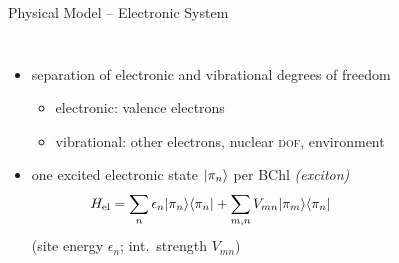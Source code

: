 \documentclass{beamer}
\begin{document}
\begin{frame}[label=ElHamiltonian]{Physical Model -- Electronic System}
  \begin{columns}
    \begin{itemize}
      \item separation of electronic and vibrational degrees of freedom
        \begin{itemize}
          \item electronic: valence electrons
          \item vibrational: other electrons, nuclear \textsc{dof}, environment
        \end{itemize}
      \item one excited electronic state $| \pi_n \rangle$ per BChl \emph{(exciton)}
        \[ H_\mathrm{el} = \sum_n \epsilon_n | \pi_n \rangle\langle \pi_n | + \sum_{m,n} V_{mn} | \pi_m \rangle\langle \pi_n | \]
      (site energy $\epsilon_n$; int.\ strength $V_{mn}$)
    \end{itemize}

    \centering
  \end{columns}
\end{frame}
\end{document}
